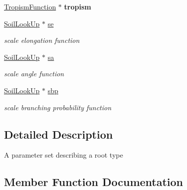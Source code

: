 \begin{DoxyCompactItemize}
\hyperlink{classCPlantBox_1_1TropismFunction}{Tropism\+Function} $\ast$ {\bfseries tropism}
\item 
\mbox{\label{classCPlantBox_1_1RootRandomOrganParameter_afb95a564311fff25c83240cee71b65a3}} 
\hyperlink{classCPlantBox_1_1SoilLookUp}{Soil\+Look\+Up} $\ast$ \hyperlink{classCPlantBox_1_1RootRandomOrganParameter_afb95a564311fff25c83240cee71b65a3}{se}
\begin{DoxyCompactList}\small\item\em scale elongation function \end{DoxyCompactList}\item 
\mbox{\label{classCPlantBox_1_1RootRandomOrganParameter_a3695cf6d8758bf9c4c6f7e79abda1563}} 
\hyperlink{classCPlantBox_1_1SoilLookUp}{Soil\+Look\+Up} $\ast$ \hyperlink{classCPlantBox_1_1RootRandomOrganParameter_a3695cf6d8758bf9c4c6f7e79abda1563}{sa}
\begin{DoxyCompactList}\small\item\em scale angle function \end{DoxyCompactList}\item 
\mbox{\label{classCPlantBox_1_1RootRandomOrganParameter_a1e3c70d279e93ac475bb605ab78717f2}} 
\hyperlink{classCPlantBox_1_1SoilLookUp}{Soil\+Look\+Up} $\ast$ \hyperlink{classCPlantBox_1_1RootRandomOrganParameter_a1e3c70d279e93ac475bb605ab78717f2}{sbp}
\begin{DoxyCompactList}\small\item\em scale branching probability function \end{DoxyCompactList}\end{DoxyCompactItemize}


\subsection{Detailed Description}
A parameter set describing a root type 

\subsection{Member Function Documentation}
\mbox{\label{classCPlantBox_1_1RootRandomOrganParameter_ade495f4945b55f108b5f2d6a5ca1f559}} 
